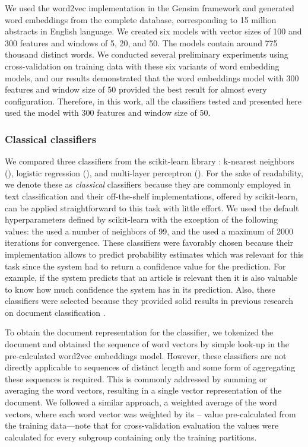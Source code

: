 We used the word2vec implementation in the Gensim framework \parencite{rehurek2010a} and generated word embeddings from the complete  database, corresponding to 15 million abstracts in English language.
We created six models with vector sizes of 100 and 300 features and windows of 5, 20, and 50.
The models contain around 775 thousand distinct words.
We conducted several preliminary experiments using cross-validation on training data with these six variants of word embedding models, and our results demonstrated that the word embeddings model with 300 features and window size of 50 provided the best result for almost every configuration.
Therefore, in this work, all the classifiers tested and presented here used the model with 300 features and window size of 50.


\subsubsection{Classical classifiers}

We compared three classifiers from the scikit-learn library \parencite{pedregosa2011a}: k-nearest neighbors (), logistic regression (), and multi-layer perceptron ().
For the sake of readability, we denote these as \textit{classical} classifiers because they are commonly employed in text classification and their off-the-shelf implementations, offered by scikit-learn, can be applied straightforward to this task with little effort.
We used the default hyperparameters defined by scikit-learn with the exception of the following values: the  used a number of neighbors of 99, and the  used a maximum of 2000 iterations for convergence.
These classifiers were favorably chosen because their implementation allows to predict probability estimates which was relevant for this task since the system had to return a confidence value for the prediction.
For example, if the system predicts that an article is relevant then it is also valuable to know how much confidence the system has in its prediction.
Also, these classifiers were selected because they provided solid results in previous research on document classification \parencite{kamath2018a,kadhim2019a,shah2020a}.

To obtain the document representation for the classifier, we tokenized the document and obtained the sequence of word vectors by simple look-up in the pre-calculated word2vec embeddings model.
However, these classifiers are not directly applicable to sequences of distinct length and some form of aggregating these sequences is required.
This is commonly addressed by summing or averaging the word vectors, resulting in a single vector representation of the document.
We followed a similar approach, a weighted average of the word vectors, where each word vector was weighted by its -- value pre-calculated from the training data---note that for cross-validation evaluation the  values were calculated for every subgroup containing only the training partitions.


